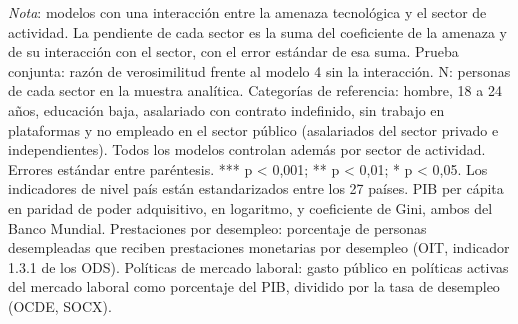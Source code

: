 \documentclass[
  spanish,
  12pt,
]{article}
\begin{document}
{\begin{longtable}[]
\end{longtable}

}

\emph{Nota}: modelos con una interacción entre la amenaza tecnológica y
el sector de actividad. La pendiente de cada sector es la suma del
coeficiente de la amenaza y de su interacción con el sector, con el
error estándar de esa suma. Prueba conjunta: razón de verosimilitud
frente al modelo 4 sin la interacción. N: personas de cada sector en la
muestra analítica. Categorías de referencia: hombre, 18 a 24 años,
educación baja, asalariado con contrato indefinido, sin trabajo en
plataformas y no empleado en el sector público (asalariados del sector
privado e independientes). Todos los modelos controlan además por sector
de actividad. Errores estándar entre paréntesis. *** p \textless{}
0,001; ** p \textless{} 0,01; * p \textless{} 0,05. Los indicadores de
nivel país están estandarizados entre los 27 países. PIB per cápita en
paridad de poder adquisitivo, en logaritmo, y coeficiente de Gini, ambos
del Banco Mundial. Prestaciones por desempleo: porcentaje de personas
desempleadas que reciben prestaciones monetarias por desempleo (OIT,
indicador 1.3.1 de los ODS). Políticas de mercado laboral: gasto público
en políticas activas del mercado laboral como porcentaje del PIB,
dividido por la tasa de desempleo (OCDE, SOCX).
\end{document}

